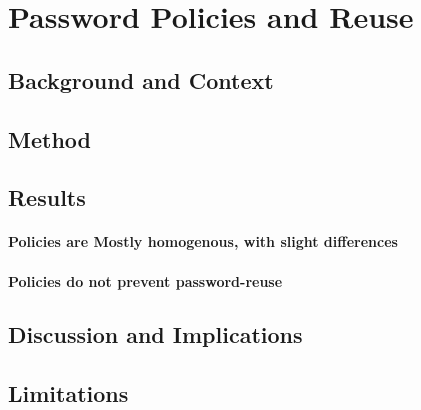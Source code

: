 \chapter[Password Policies and Reuse]{Password Policies and Reuse}\label{chap:policies_reuse}
\section{Background and Context}
\section{Method}

\section{Results}
\subsubsection{Policies are Mostly homogenous, with slight differences}
\subsubsection{Policies do not prevent password-reuse}

\section{Discussion and Implications}

\section{Limitations}
